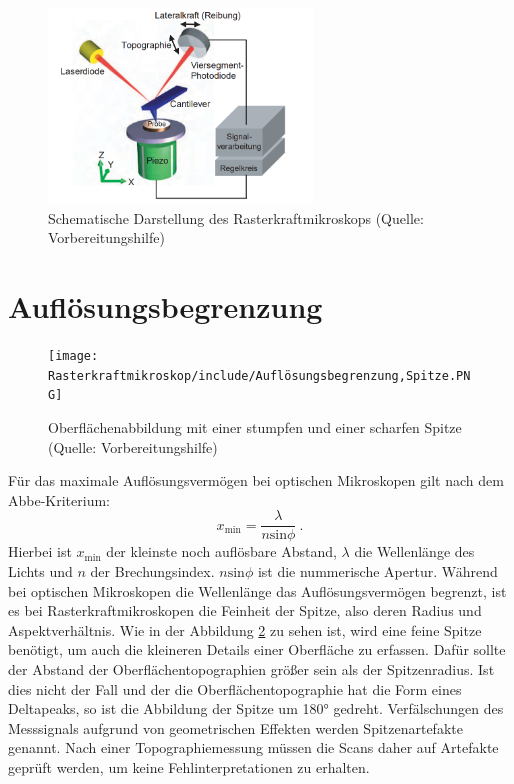 \begin{figure}[H]
    \centering
    \includegraphics[width=70mm,scale=0.35]{Rasterkraftmikroskop/include/Rasterkraftmikroskop.PNG}
    \caption{Schematische Darstellung des Rasterkraftmikroskops (Quelle: Vorbereitungshilfe)} 
    \label{fig:Rasterkraftmikroskop}
\end{figure}


\section{Auflösungsbegrenzung}
\label{chap:aufloesung}
\begin{figure}[H]
    \centering
    \texttt{[image: Rasterkraftmikroskop/include/Auflösungsbegrenzung,Spitze.PNG]}
    \caption{Oberflächenabbildung mit einer stumpfen und einer scharfen Spitze (Quelle: Vorbereitungshilfe)} 
    \label{fig:Auflösungsbegrenzung,Spitze}
\end{figure}
Für das maximale Auflösungsvermögen bei optischen Mikroskopen gilt nach dem Abbe-Kriterium:
$$x_\text{min}=\frac{\lambda}{n\text{sin}\phi}~.$$
Hierbei ist $x_\text{min}$ der kleinste noch auflösbare Abstand, $\lambda$ die Wellenlänge des Lichts und $n$ der Brechungsindex. $n\text{sin}\phi$ ist die nummerische Apertur. Während bei optischen Mikroskopen die Wellenlänge das Auflösungsvermögen begrenzt, ist es bei Rasterkraftmikroskopen die Feinheit der Spitze, also deren Radius und Aspektverhältnis. Wie in der Abbildung \ref{fig:Auflösungsbegrenzung,Spitze} zu sehen ist, wird eine feine Spitze benötigt, um auch die kleineren Details einer Oberfläche zu erfassen. Dafür sollte der Abstand der Oberflächentopographien größer sein als der Spitzenradius. Ist dies nicht der Fall und der die Oberflächentopographie hat die Form eines Deltapeaks, so ist die Abbildung der Spitze um 180° gedreht. Verfälschungen des Messsignals aufgrund von geometrischen Effekten werden Spitzenartefakte genannt. Nach einer Topographiemessung müssen die Scans daher auf Artefakte geprüft werden, um keine Fehlinterpretationen zu erhalten.


